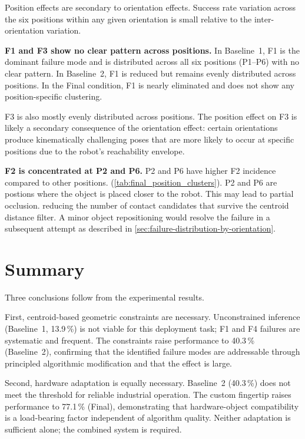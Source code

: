 \documentclass[12pt, a4paper]{report}
\begin{document}
Position effects are secondary to orientation effects. 
Success rate variation across the six positions within any given orientation is small relative to the inter-orientation variation. 

\textbf{F1 and F3 show no clear pattern across positions.} 
In Baseline~1, F1 is the dominant failure mode and is distributed across all six positions (P1--P6) with no clear pattern. In Baseline~2, F1 is reduced but remains evenly distributed across positions. In the Final condition, F1 is nearly eliminated and does not show any position-specific clustering.

F3 is also mostly evenly distributed across positions. The position effect on F3 is likely a secondary consequence of the orientation effect: certain orientations produce kinematically challenging poses that are more likely to occur at specific positions due to the robot's reachability envelope.

\textbf{F2 is concentrated at P2 and P6.}
P2 and P6 have higher F2 incidence compared to other positions. (\cref{tab:final_position_clusters}). P2 and P6 are postions where the object is placed closer to the robot. This may lead to partial occlusion. reducing the number of contact candidates that survive the centroid distance filter. A minor object repositioning would resolve the failure in a subsequent attempt as described in \cref{sec:failure-distribution-by-orientation}. 

\section{Summary}
\label{sec:results-summary}

Three conclusions follow from the experimental results.

First, centroid-based geometric constraints are necessary. 
Unconstrained inference (Baseline~1, 13.9\,\%) is not viable for this deployment task; 
F1 and F4 failures are systematic and frequent. The constraints raise performance to 40.3\,\% (Baseline~2), confirming that the identified failure modes are addressable through principled algorithmic modification and that the effect is large.

Second, hardware adaptation is equally necessary. Baseline~2 (40.3\,\%) does not meet the threshold for reliable industrial operation. The custom fingertip raises performance to 77.1\,\% (Final), 
demonstrating that hardware-object compatibility is a load-bearing factor independent of algorithm quality. Neither adaptation is sufficient alone; the combined system is required.
\end{document}
